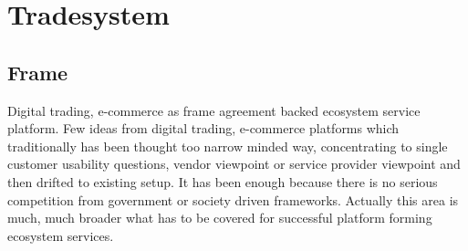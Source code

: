 %
%
%

\part{Tradesystem}
\label{tradesystem}
\chapter{Frame}
\label{frame_agreement}

Digital trading, e-commerce as frame agreement backed ecosystem service platform.
Few ideas from digital trading, e-com\-mer\-ce platforms which traditionally has been thought too narrow mind\-ed way, concentrating to single customer usability questions, vendor viewpoint or service provider viewpoint and then drifted to existing setup. It has been enough because there is no serious competition from government or society driven frameworks. Actually this area is much, much broader what has to be covered for successful platform forming ecosystem services.

